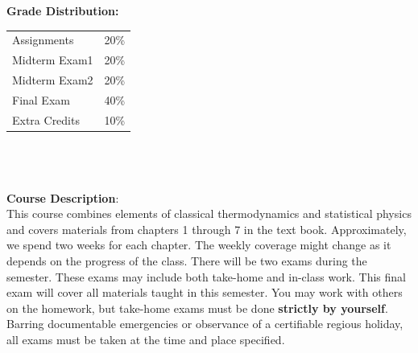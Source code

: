 \documentclass[11pt]{article}
\begin{document}
\textbf {\large Grade Distribution:} \\
\begin{tabular}{ l l }
Assignments    & 20\% \\
Midterm Exam1  & 20\% \\
Midterm Exam2  & 20\% \\
Final Exam     & 40\% \\
Extra Credits  & 10\% \\
\end{tabular} \\\\\\
\textbf {\large Course Description}:\\
This course combines elements of classical thermodynamics and statistical physics and covers materials from chapters 1 through 7 in the text book. Approximately, we spend two weeks for each chapter. The weekly coverage might change as it depends on the progress of the class. There will be two exams during the semester. These exams may include both take-home and in-class work. This final exam will cover all materials taught in this semester. You may work with others on the homework, but take-home exams must be done {\bf strictly by yourself}. Barring documentable emergencies or observance of a certifiable regious holiday, all exams must be taken at the time and place specified.
\end{document}
